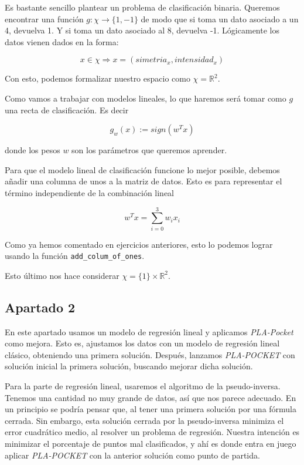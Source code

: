 \documentclass[11pt]{article}
\begin{document}
Es bastante sencillo plantear un problema de clasificación binaria. Queremos encontrar una función $g: \chi \rightarrow \{1, -1\}$ de modo que si toma un dato asociado a un 4, devuelva 1. Y si toma un dato asociado al 8, devuelva -1. Lógicamente los datos vienen dados en la forma:

$$x \in \chi \Rightarrow x = (simetria_x, intensidad_x)$$

Con esto, podemos formalizar nuestro espacio como $\chi = \mathbb{R}^2$.

Como vamos a trabajar con modelos lineales, lo que haremos será tomar como $g$ una recta de clasificación. Es decir

$$g_w(x) := sign(w^T x)$$

donde los pesos $w$ son los parámetros que queremos aprender.

Para que el modelo lineal de clasificación funcione lo mejor posible, debemos añadir una columna de unos a la matriz de datos. Esto es para representar el término independiente de la combinación lineal

$$w^T x = \sum_{i = 0}^{3} w_i x_i$$

Como ya hemos comentado en ejercicios anteriores, esto lo podemos lograr usando la función \lstinline{add_colum_of_ones}.

Esto último nos hace considerar $\chi = \{1\} \times \mathbb{R}^2$.

\pagebreak

\subsection{Apartado 2}

En este apartado usamos un modelo de regresión lineal y aplicamos \emph{PLA-Pocket} como mejora. Esto es, ajustamos los datos con un modelo de regresión lineal clásico, obteniendo una primera solución. Después, lanzamos \emph{PLA-POCKET} con solución inicial la primera solución, buscando mejorar dicha solución.

Para la parte de regresión lineal, usaremos el algoritmo de la pseudo-inversa. Tenemos una cantidad no muy grande de datos, así que nos parece adecuado. En un principio se podría pensar que, al tener una primera solución por una fórmula cerrada. Sin embargo, esta solución cerrada por la pseudo-inversa minimiza el error cuadrático medio, al resolver un problema de regresión. Nuestra intención es minimizar el porcentaje de puntos mal clasificados, y ahí es donde entra en juego aplicar \emph{PLA-POCKET} con la anterior solución como punto de partida.
\end{document}
